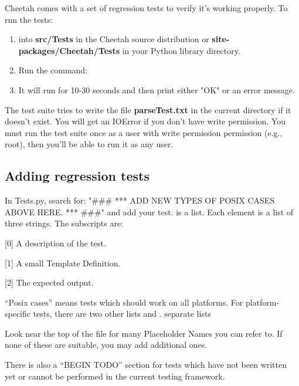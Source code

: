 Cheetah comes with a set of regression tests to verify it's working properly.
To run the tests:

\begin{enumerate}

\item  {} into {\bf src/Tests} in the Cheetah source distribution 
     or {\bf site-packages/Cheetah/Tests} in your Python library directory.
     
\item  Run the command:  

\item  It will run for 10-30 seconds and then print either "OK" or an error message.

\end{enumerate}

The test suite tries to write the file {\bf parseTest.txt} in the current 
directory if it doesn't exist.  You will get an IOError if you don't have write
permission.  You must run the test suite once as a user with write permission
permission (e.g., root), then you'll be able to run it as any user.


\subsection{Adding regression tests}

In Tests.py, search for: "\#\#\# *** ADD NEW TYPES OF POSIX CASES
ABOVE HERE. ***  \#\#\#" and add your test.   is a list.  Each
element is a list of three strings.  The subscripts are:

\begin{description}

\item{[0]}  A description of the test.

\item{[1]}  A small Template Definition.

\item{[2]}  The expected output.

\end{description}


``Posix cases'' means tests which should work on all platforms.  For
platform-specific tests, there are two other lists  and
. 
separate lists 

Look near the top of the file for many Placeholder Names you can refer to.  If
none of these are suitable, you may add additional ones.

There is also a ``BEGIN TODO'' section for tests which have not been written
yet or cannot be performed in the current testing framework.

